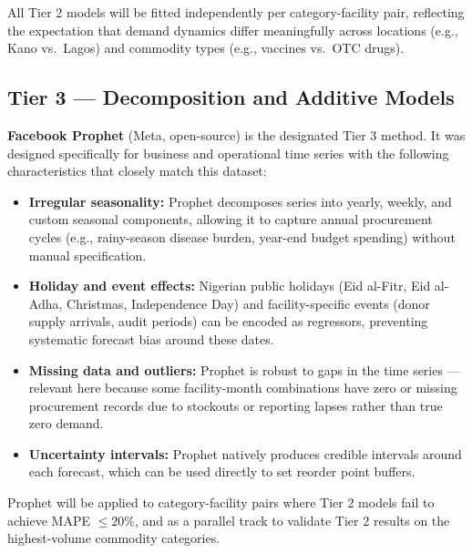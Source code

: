 \documentclass[12pt, a4paper]{article}
\begin{document}
\vspace{0.6em}

All Tier 2 models will be fitted independently per category-facility pair,
reflecting the expectation that demand dynamics differ meaningfully across
locations (e.g., Kano vs.\ Lagos) and commodity types (e.g., vaccines vs.\
OTC drugs).

\subsection{Tier 3 --- Decomposition and Additive Models}

\textbf{Facebook Prophet} (Meta, open-source) is the designated Tier 3
method. It was designed specifically for business and operational time
series with the following characteristics that closely match this dataset:

\begin{itemize}[leftmargin=1.5em, itemsep=4pt]
  \item \textbf{Irregular seasonality:} Prophet decomposes series into
        yearly, weekly, and custom seasonal components, allowing it to
        capture annual procurement cycles (e.g., rainy-season disease
        burden, year-end budget spending) without manual specification.

  \item \textbf{Holiday and event effects:} Nigerian public holidays
        (Eid al-Fitr, Eid al-Adha, Christmas, Independence Day) and
        facility-specific events (donor supply arrivals, audit periods) can
        be encoded as regressors, preventing systematic forecast bias around
        these dates.

  \item \textbf{Missing data and outliers:} Prophet is robust to gaps in
        the time series --- relevant here because some facility-month
        combinations have zero or missing procurement records due to
        stockouts or reporting lapses rather than true zero demand.

  \item \textbf{Uncertainty intervals:} Prophet natively produces
        credible intervals around each forecast, which can be used directly
        to set reorder point buffers.
\end{itemize}

Prophet will be applied to category-facility pairs where Tier 2 models fail
to achieve MAPE $\leq 20\%$, and as a parallel track to validate Tier 2
results on the highest-volume commodity categories.
\end{document}
